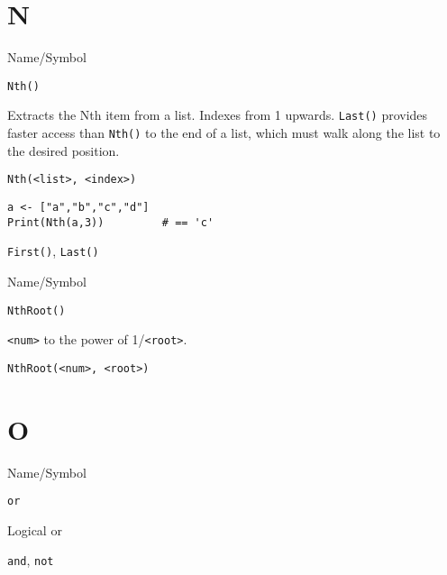\rl
\section{N}
\rl



\begin{desc}{Name/Symbol}
\item[Name/Symbol]	\verb+Nth()+

\item[Description]	Extracts the Nth item from a list.  Indexes from 1 upwards.
		\verb+Last()+ provides faster access than \verb+Nth()+ to the end of a list, 
		which must walk along the list to the desired position.

\item[Usage]
\begin{verbatim}
Nth(<list>, <index>)
\end{verbatim}

\item[Example]	
\begin{verbatim}
a <- ["a","b","c","d"]
Print(Nth(a,3)) 		# == 'c'
\end{verbatim}

\item[See Also]	\verb+First()+, \verb+Last()+ 
\end{desc}

\rl


\begin{desc}{Name/Symbol}
\item[Name/Symbol]	\verb+NthRoot()+

\item[Description]	\verb+<num>+ to the power of  1/\verb+<root>+.

\item[Usage]		
\begin{verbatim}
NthRoot(<num>, <root>)
\end{verbatim}

\item[Example]	

\item[See Also]	
\end{desc}

\rl
\section{O}
\rl


\begin{desc}{Name/Symbol}
\item[Name/Symbol]	\verb+or+                   

\item[Description]	Logical or

\item[Usage]		

\item[Example]	

\item[See Also]	\verb+and+, \verb+not+
\end{desc}

